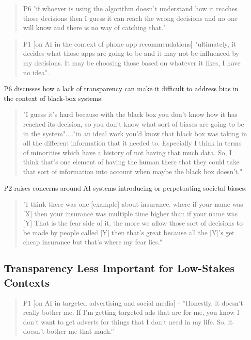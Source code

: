 \documentclass[manuscript,screen,review]{acmart}
\begin{document}
\begin{quote}
P6  "if whoever is using the algorithm doesn’t understand how it reaches those decisions then I guess it can reach the wrong decisions and no one will know and there is no way of catching that." 
\end{quote}

\begin{quote}
P1 [on AI in the context of phone app recommendations]  "ultimately, it decides what those apps are going to be and it may not be influenced by my decisions. It may be choosing those based on whatever it likes, I have no idea".
\end{quote}

P6 discusses how a lack of transparency can make it difficult to address bias in the context of black-box systems: 

\begin{quote}
"I guess it's hard because with the black box you don’t know how it has reached its decision, so you don’t know what sort of biases are going to be in the system"...."in an ideal work you'd know that black box was taking in all the different information that it needed to. Especially I think in terms of minorities which have a history of not having that much data. So, I think that’s one element of having the human there that they could take that sort of information into account when maybe the black box doesn’t."
\end{quote}

P2 raises concerns around AI systems introducing or perpetuating societal biases:

\begin{quote}
"I think there was one [example] about insurance, where if your name was [X] then your insurance was multiple time higher than if your name was [Y] That is the fear side of it, the more we allow those sort of decisions to be made by people called [Y] then that’s great because all the [Y]'s get cheap insurance but that’s where my fear lies."
\end{quote}



\subsection{Transparency Less Important for Low-Stakes Contexts}

\begin{quote}
P1 [on AI in targeted advertising and social media] - ''Honestly, it doesn’t really bother me. If I'm getting targeted ads that are for me, you know I don’t want to get adverts for things that I don’t need in my life. So, it doesn’t bother me that much.''
\end{quote}
\end{document}
